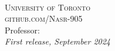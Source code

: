\documentclass[openany,11pt,fleqn]{book} %
\begin{document}

\newpage
~\vfill
\thispagestyle{empty}


\noindent\textsc{University of Toronto}\\

\noindent \textsc{github.com/Nasr-905}\\ %

\noindent Professor: \\ %

\noindent \textit{First release, September 2024} %



\pagestyle{empty} %

\tableofcontents %


\pagestyle{fancy} %



% 

% 

% 

% 

% 
\end{document}

